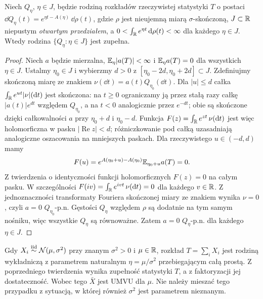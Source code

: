 \begin{twierdzenie}
\label{thm:complete-exponential-family}
Niech $Q_\eta$, $\eta\in J$, będzie rodziną rozkładów rzeczywistej
statystyki $T$ o postaci
$\dd Q_\eta(t)=e^{\eta t-A(\eta)}\,\dd\rho(t)$,
gdzie $\rho$ jest nieujemną miarą $\sigma$-skończoną,
$J\subset\mathbb R$ niepustym \emph{otwartym przedziałem}, a
$0<\int_{\mathbb R}e^{\eta t}\,\mathrm d\rho(t)<\infty$ dla każdego $\eta\in J$.
Wtedy rodzina $\{Q_\eta:\eta\in J\}$ jest zupełna.
\end{twierdzenie}
\begin{proof}
Niech $a$ będzie mierzalna, $\mathbb E_\eta|a(T)|<\infty$
i $\mathbb E_\eta a(T)=0$ dla wszystkich $\eta\in J$.
Ustalmy $\eta_0\in J$ i wybierzmy $d>0$ z
$[\eta_0-2d,\eta_0+2d]\subset J$.
Zdefiniujmy skończoną miarę ze znakiem
$\nu(\dd t)=a(t)Q_{\eta_0}(\dd t)$. Dla $|u|\le d$
całka $\int_{\mathbb R}e^{u t}|\nu|(\mathrm d t)$ jest skończona:
na $t\ge0$ ograniczamy ją przez stałą razy całkę
$|a(t)|e^{dt}$ względem $Q_{\eta_0}$,
a na $t<0$ analogicznie przez $e^{-dt}$;
obie są skończone dzięki całkowalności $a$ przy
$\eta_0+d$ i $\eta_0-d$. Funkcja
$F(z)=\int_{\mathbb R}e^{zt}\,\nu(\mathrm d t)$ jest więc holomorficzna
w pasku $|\operatorname{Re}z|<d$; różniczkowanie pod całką
uzasadniają analogiczne oszacowania na mniejszych paskach.
Dla rzeczywistego $u\in(-d,d)$ mamy
\[
F(u)=e^{A(\eta_0+u)-A(\eta_0)}\mathbb E_{\eta_0+u}a(T)=0.
\]
Z twierdzenia o identyczności funkcji holomorficznych
$F(z)=0$ na całym pasku. W szczególności
$F(iv)=\int_{\mathbb R}e^{ivt}\,\nu(\mathrm d t)=0$ dla każdego $v\in\mathbb R$.
Z jednoznaczności transformaty Fouriera skończonej miary
ze znakiem wynika $\nu=0$, czyli $a=0$ $Q_{\eta_0}$-p.n.
Gęstości $Q_\eta$ względem $\rho$ są dodatnie na tym samym
nośniku, więc wszystkie $Q_\eta$ są równoważne. Zatem
$a=0$ $Q_\eta$-p.n. dla każdego $\eta\in J$.
\end{proof}
\begin{przyklad}
Gdy $X_i\mathrel{\overset{\mathrm{iid}}\sim}\mathcal N(\mu,\sigma^2)$ przy znanym $\sigma^2>0$
i $\mu\in\mathbb R$, rozkład $T=\sum_iX_i$ jest rodziną wykładniczą
z parametrem naturalnym $\eta=\mu/\sigma^2$ przebiegającym
całą prostą. Z poprzedniego twierdzenia wynika zupełność
statystyki $T$, a z faktoryzacji jej dostateczność.
Wobec tego $\bar X$ jest UMVU dla $\mu$. Nie należy
mieszać tego przypadku z sytuacją, w której również
$\sigma^2$ jest parametrem nieznanym.
\end{przyklad}

